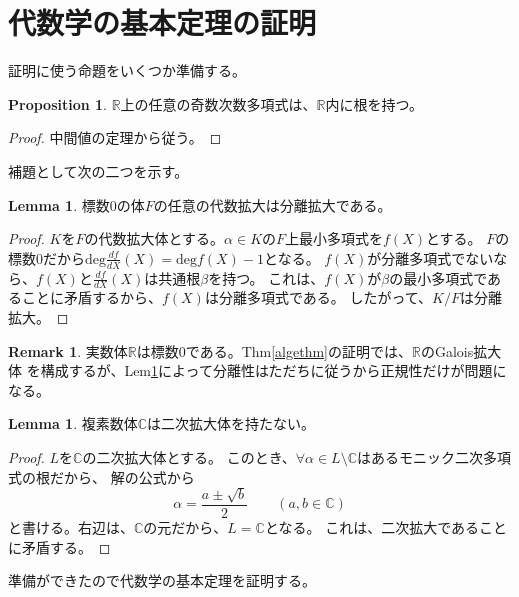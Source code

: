 \documentclass{ltjsarticle}
\theoremstyle{definition}
\newtheorem{prop}[definition]{Proposition}
\newtheorem{lemma}[definition]{Lemma}
\newtheorem{remark}[definition]{Remark}
\begin{document}
\section{代数学の基本定理の証明}
証明に使う命題をいくつか準備する。
\begin{prop}\label{fact}
  $\mathbb{R}$上の任意の奇数次数多項式は、$\mathbb{R}$内に根を持つ。
\end{prop}
\begin{proof}
  中間値の定理から従う。
\end{proof}
補題として次の二つを示す。
\begin{lemma}\label{kannzennsei}
 標数0の体$F$の任意の代数拡大は分離拡大である。
\end{lemma}\label{nijikakudainohukanousei}
\begin{proof}
  $K$を$F$の代数拡大体とする。$\alpha\in K$の$F$上最小多項式を$f(X)$とする。
  $F$の標数0だから$\mathrm{deg}\frac{df}{dX}(X)=\mathrm{deg}f(X)-1$となる。
  $f(X)$が分離多項式でないなら、$f(X)$と$\frac{df}{dX}(X)$は共通根$\beta$を持つ。
  これは、$f(X)$が$\beta$の最小多項式であることに矛盾するから、$f(X)$は分離多項式である。
  したがって、$K/F$は分離拡大。
\end{proof}
\begin{remark}
実数体$\mathbb{R}$は標数0である。Thm\ref{algethm}の証明では、$\mathbb{R}$のGalois拡大体
を構成するが、Lem\ref{kannzennsei}によって分離性はただちに従うから正規性だけが問題になる。

\end{remark}
\begin{lemma}
  複素数体$\mathbb{C}$は二次拡大体を持たない。
\end{lemma}
\begin{proof}
$L$を$\mathbb{C}$の二次拡大体とする。
このとき、$\forall\alpha\in L\setminus \mathbb{C}$はあるモニック二次多項式の根だから、
解の公式から
\[\alpha=\frac{a\pm \sqrt{b}}{2}\qquad(a,b\in\mathbb{C})\]
と書ける。右辺は、$\mathbb{C}$の元だから、$L=\mathbb{C}$となる。
これは、二次拡大であることに矛盾する。
\end{proof}
準備ができたので代数学の基本定理を証明する。
\end{document}
